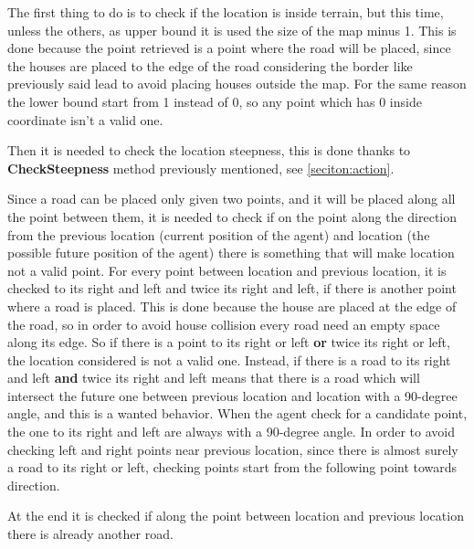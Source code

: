 \documentclass[12pt]{article}
\begin{document}
    The first thing to do is to check if the location is inside terrain, but this time, unless the others, as upper bound it is used the size of the map minus 1. This is done
    because the point retrieved is a point where the road will be placed, since the houses are placed to the edge of the road considering the border like previously said
    lead to avoid placing houses outside the map. For the same reason the lower bound start from 1 instead of 0, so any point which has 0 inside coordinate isn't a valid one.

    Then it is needed to check the location steepness, this is done thanks to \textbf{CheckSteepness} method previously mentioned, see \ref{seciton:action}.

    Since a road can be placed only given two points, and it will be placed along all the point between them, it is needed to check if on the point along the direction
    from the previous location (current position of the agent) and location (the possible future position of the agent) there is something that will make location not 
    a valid point. For every point between location and previous location, it is checked to its right and left and twice its right and left, if there is another point where
    a road is placed. This is done because the house are placed at the edge of the road, so in order to avoid house collision every road need an empty space along
    its edge. So if there is a point to its right or left \textbf{or} twice its right or left, the location considered is not a valid one. Instead, if there is a road to
    its right and left \textbf{and} twice its right and left means that there is a road which will intersect the future one between previous location and location with a 
    90-degree angle, and this is a wanted behavior. When the agent check for a candidate point, the one to its right and left are always with a 90-degree angle. 
    In order to avoid checking left and right points near previous location, since there is almost surely a road to its right or left, checking points start from the 
    following point towards direction.
    
    At the end it is checked if along the point between location and previous location there is already another road.
\end{document}
